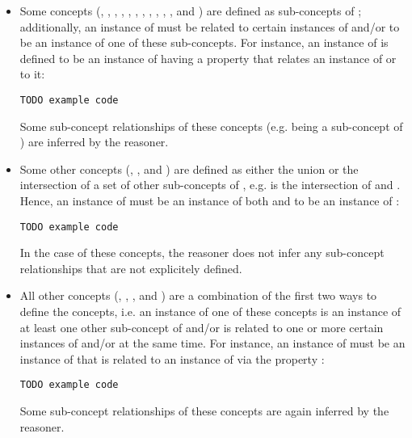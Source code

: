 \begin{itemize}
  \item Some concepts (, , , , , , , , , , , and ) are defined as sub-concepts of ; additionally, an instance of  must be related to certain instances of  and/or  to be an instance of one of these sub-concepts. For instance, an instance of  is defined to be an instance of  having a property  that relates an instance of  or  to it:
  
  \begin{lstlisting}
TODO example code
  \end{lstlisting}
  
  Some sub-concept relationships of these concepts (e.g.  being a sub-concept of ) are inferred by the  reasoner.

  \item Some other concepts (, , and ) are defined as either the union or the intersection of a set of other sub-concepts of , e.g.  is the intersection of  and . Hence, an instance of  must be an instance of both  and  to be an instance of :
  
  \begin{lstlisting}
TODO example code
  \end{lstlisting}
  
  In the case of these concepts, the  reasoner does not infer any sub-concept relationships that are not explicitely defined.
  
  \item All other concepts (, , , and ) are a combination of the first two ways to define the concepts, i.e. an instance of one of these concepts is an instance of at least one other sub-concept of  and/or is related to one or more certain instances of  and/or  at the same time. For instance, an instance of  must be an instance of  that is related to an instance of  via the property :
  
  \begin{lstlisting}
TODO example code
  \end{lstlisting}
  
  Some sub-concept relationships of these concepts are again inferred by the  reasoner.
\end{itemize}

